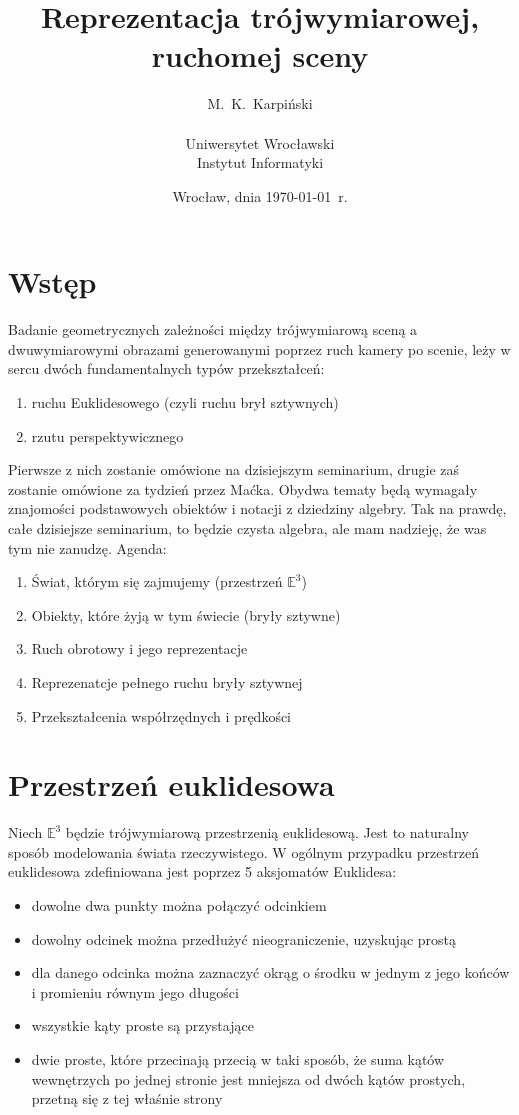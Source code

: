 \documentclass[a4paper,12pt]{article}
\title{Reprezentacja trójwymiarowej, ruchomej sceny}
\author{M.~K.~Karpiński\\
\\
Uniwersytet Wrocławski\\
Instytut Informatyki}
\date{Wrocław, dnia \today\ r.}
\newcommand{\E}{\mathbb{E}}
\begin{document}
\maketitle

\section{Wstęp}
\indent \indent Badanie geometrycznych zależności między trójwymiarową sceną a dwuwymiarowymi obrazami generowanymi poprzez ruch kamery po scenie, leży w sercu dwóch fundamentalnych typów przekształceń:

\begin{enumerate}
  \item ruchu Euklidesowego (czyli ruchu brył sztywnych)
  \item rzutu perspektywicznego
\end{enumerate}

Pierwsze z nich zostanie omówione na dzisiejszym seminarium, drugie zaś zostanie omówione za tydzień przez Maćka. Obydwa tematy będą wymagały znajomości podstawowych obiektów i notacji z dziedziny algebry. Tak na prawdę, całe dzisiejsze seminarium, to będzie czysta algebra, ale mam nadzieję, że was tym nie zanudzę. Agenda:

\begin{enumerate}
\item Świat, którym się zajmujemy (przestrzeń $\E^3$)
\item Obiekty, które żyją w tym świecie (bryły sztywne)
\item Ruch obrotowy i jego reprezentacje
\item Reprezenatcje pełnego ruchu bryły sztywnej 
\item Przekształcenia współrzędnych i prędkości
\end{enumerate}

\section{Przestrzeń euklidesowa}
\indent \indent Niech $\E^3$ będzie trójwymiarową przestrzenią euklidesową. Jest to naturalny sposób modelowania świata rzeczywistego. W ogólnym przypadku przestrzeń euklidesowa zdefiniowana jest poprzez 5 aksjomatów Euklidesa:

\begin{itemize}
\item dowolne dwa punkty można połączyć odcinkiem
\item dowolny odcinek można przedłużyć nieograniczenie, uzyskując prostą
\item dla danego odcinka można zaznaczyć okrąg o środku w jednym z jego końców i promieniu równym jego długości
\item wszystkie kąty proste są przystające
\item dwie proste, które przecinają przecią w taki sposób, że suma kątów wewnętrzych po jednej stronie jest mniejsza od dwóch kątów prostych, przetną się z tej właśnie strony
\end{itemize}
\end{document}

